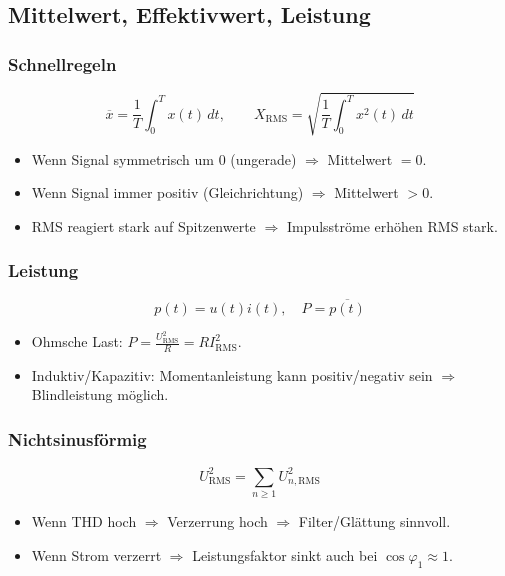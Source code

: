 \subsection{Mittelwert, Effektivwert, Leistung}

\subsubsection{Schnellregeln}

\[
\overline{x}=\frac{1}{T}\int_0^T x(t)\,dt,\qquad
X_{\mathrm{RMS}}=\sqrt{\frac{1}{T}\int_0^T x^2(t)\,dt}
\]

\begin{itemize}
\item Wenn Signal symmetrisch um 0 (ungerade) $\Rightarrow$ Mittelwert $=0$.
\item Wenn Signal immer positiv (Gleichrichtung) $\Rightarrow$ Mittelwert $>0$.
\item RMS reagiert stark auf Spitzenwerte $\Rightarrow$ Impulsströme erhöhen RMS stark.
\end{itemize}

\subsubsection{Leistung}

\[
p(t)=u(t)i(t),\quad P=\overline{p(t)}
\]

\begin{itemize}
\item Ohmsche Last: $P=\frac{U_{\mathrm{RMS}}^2}{R}=R I_{\mathrm{RMS}}^2$.
\item Induktiv/Kapazitiv: Momentanleistung kann positiv/negativ sein $\Rightarrow$ Blindleistung möglich.
\end{itemize}

\subsubsection{Nichtsinusförmig}

\[
U_{\mathrm{RMS}}^2=\sum_{n\ge 1} U_{n,\mathrm{RMS}}^2
\]

\begin{itemize}
\item Wenn THD hoch $\Rightarrow$ Verzerrung hoch $\Rightarrow$ Filter/Glättung sinnvoll.
\item Wenn Strom verzerrt $\Rightarrow$ Leistungsfaktor sinkt auch bei $\cos\varphi_1\approx 1$.
\end{itemize}

